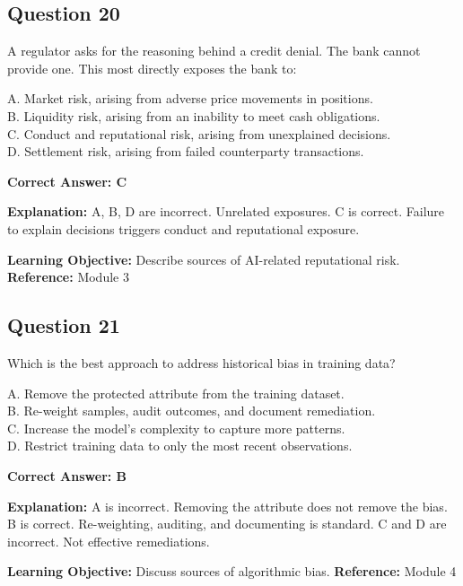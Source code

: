 \documentclass[11pt]{article}
\begin{document}
	\subsection*{Question 20}
	A regulator asks for the reasoning behind a credit denial. The bank
	cannot provide one. This most directly exposes the bank to:
	
	A. Market risk, arising from adverse price movements in positions.\\
	B. Liquidity risk, arising from an inability to meet cash obligations.\\
	C. Conduct and reputational risk, arising from unexplained decisions.\\
	D. Settlement risk, arising from failed counterparty transactions.
	
	\vspace{0.4em}
	\textbf{Correct Answer: C}
	
	\textbf{Explanation:}
	A, B, D are incorrect. Unrelated exposures.
	C is correct. Failure to explain decisions triggers conduct and
	reputational exposure.
	
	\textbf{Learning Objective:} Describe sources of AI-related reputational
	risk.
	\textbf{Reference:} Module 3
	
	\subsection*{Question 21}
	Which is the best approach to address historical bias in training data?
	
	A. Remove the protected attribute from the training dataset.\\
	B. Re-weight samples, audit outcomes, and document remediation.\\
	C. Increase the model's complexity to capture more patterns.\\
	D. Restrict training data to only the most recent observations.
	
	\vspace{0.4em}
	\textbf{Correct Answer: B}
	
	\textbf{Explanation:}
	A is incorrect. Removing the attribute does not remove the bias.
	B is correct. Re-weighting, auditing, and documenting is standard.
	C and D are incorrect. Not effective remediations.
	
	\textbf{Learning Objective:} Discuss sources of algorithmic bias.
	\textbf{Reference:} Module 4
	
\end{document}
